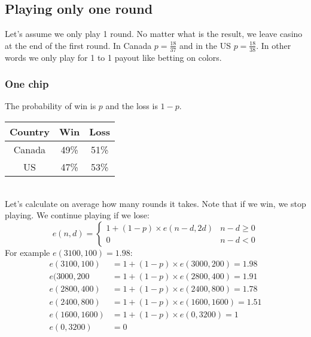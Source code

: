 \documentclass{book}
\begin{document}
	\subsection{Playing only one round}
	Let's assume we only play 1 round. No matter what is the result, we leave casino at the end of the first round. In Canada $p = \frac{18}{37}$ and in the US $p = \frac{18}{38}$. In other words we only play for 1 to 1 payout like betting on colors.
	\subsubsection{One chip}
	The probability of win is $p$ and the loss is $1 - p$. \\
	\par
	\begin{tabular}[h!]{c c c}
		\toprule
		Country & Win & Loss \\
		\midrule
		Canada & 49\% & 51\% \\
		US & 47\% & 53\% \\
		\bottomrule
	\end{tabular} \\
	Let's calculate on average how many rounds it takes. Note that if we win, we stop playing. We continue playing if we lose:
	\begin{equation*}
		e(n, d) = \begin{cases}
			1 + (1 - p) \times e(n - d, 2d) & n - d \ge 0 \\
			0 & n - d < 0
		\end{cases}
	\end{equation*}
	For example $e(3100, 100) = 1.98$:
	\begin{equation*}
		\begin{split}
			e(3100, 100) &= 1 + (1 - p) \times e(3000, 200) = 1.98 \\
			e(3000, 200 &= 1 + (1 - p) \times e(2800, 400) = 1.91 \\
			e(2800, 400) &= 1 + (1 - p) \times e(2400, 800) = 1.78 \\
			e(2400, 800) &= 1 + (1 - p) \times e(1600, 1600) = 1.51 \\
			e(1600, 1600) &= 1 + (1 - p) \times e(0, 3200) = 1 \\
			e(0, 3200) &= 0
		\end{split}
	\end{equation*}
\end{document}
